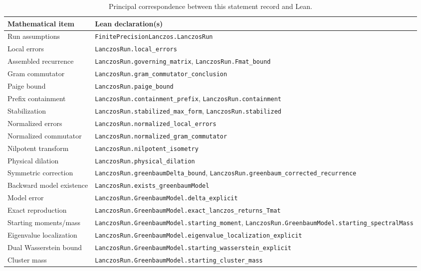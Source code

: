 \documentclass[11pt]{article}
\newcommand{\lean}[1]{\texorpdfstring{\textcolor{leanblue}{\nolinkurl{#1}}}{#1}}
\theoremstyle{definition}
\begin{document}
\begin{table}[htbp]
\centering
\footnotesize
\begin{tabular}{p{}p{}}
\toprule
Mathematical item & Lean declaration(s) \\
\midrule
Run assumptions & \lean{FinitePrecisionLanczos.LanczosRun} \\
Local errors & \lean{LanczosRun.local_errors} \\
Assembled recurrence & \lean{LanczosRun.governing_matrix}, \lean{LanczosRun.Fmat_bound} \\
Gram commutator & \lean{LanczosRun.gram_commutator_conclusion} \\
Paige bound & \lean{LanczosRun.paige_bound} \\
Prefix containment & \lean{LanczosRun.containment_prefix}, \lean{LanczosRun.containment} \\
Stabilization & \lean{LanczosRun.stabilized_max_form}, \lean{LanczosRun.stabilized} \\
Normalized errors & \lean{LanczosRun.normalized_local_errors} \\
Normalized commutator & \lean{LanczosRun.normalized_gram_commutator} \\
Nilpotent transform & \lean{LanczosRun.nilpotent_isometry} \\
Physical dilation & \lean{LanczosRun.physical_dilation} \\
Symmetric correction & \lean{LanczosRun.greenbaumDelta_bound}, \lean{LanczosRun.greenbaum_corrected_recurrence} \\
Backward model existence & \lean{LanczosRun.exists_greenbaumModel} \\
Model error & \lean{LanczosRun.GreenbaumModel.delta_explicit} \\
Exact reproduction & \lean{LanczosRun.GreenbaumModel.exact_lanczos_returns_Tmat} \\
Starting moments/mass & \lean{LanczosRun.GreenbaumModel.starting_moment}, \lean{LanczosRun.GreenbaumModel.starting_spectralMass} \\
Eigenvalue localization & \lean{LanczosRun.GreenbaumModel.eigenvalue_localization_explicit} \\
Dual Wasserstein bound & \lean{LanczosRun.GreenbaumModel.starting_wasserstein_explicit} \\
Cluster mass & \lean{LanczosRun.GreenbaumModel.starting_cluster_mass} \\
\bottomrule
\end{tabular}
\caption{Principal correspondence between this statement record and Lean.}
\label{tab:map}
\end{table}
\end{document}
